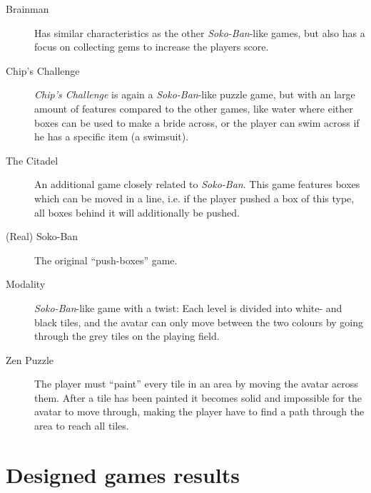 \documentclass[a4paper,titlepage,final]{report}
\begin{document}
\begin{appendices}
\begin{description}
\item [Brainman] \citep{game:brainman} Has similar characteristics as the other \textit{Soko-Ban}-like games, but also has a focus on collecting gems to increase the players score.
\item [Chip's Challenge] \citep{game:chipschallenge} \textit{Chip's Challenge} is again a \textit{Soko-Ban}-like puzzle game, but with an large amount of features compared to the other games, like water where either boxes can be used to make a bride across, or the player can swim across if he has a specific item (a swimsuit).
\item [The Citadel] \citep{game:thecitadel} An additional game closely related to \textit{Soko-Ban}. This game features boxes which can be moved in a line, i.e. if the player pushed a box of this type, all boxes behind it will additionally be pushed.
\item [(Real) Soko-Ban] \citep{game:sokoban} The original ``push-boxes'' game. 
\item [Modality] \citep{game:modality} \textit{Soko-Ban}-like game with a twist: Each level is divided into white- and black tiles, and the avatar can only move between the two colours by going through the grey tiles on the playing field.
\item [Zen Puzzle] \citep{game:zenpuzzle} The player must ``paint'' every tile in an area by moving the avatar across them. After a tile has been painted it becomes solid and impossible for the avatar to move through, making the player have to find a path through the area to reach all tiles.
\end{description}




\chapter{Designed games results}
\label{app_designedresults}


\end{appendices}
\end{document}
